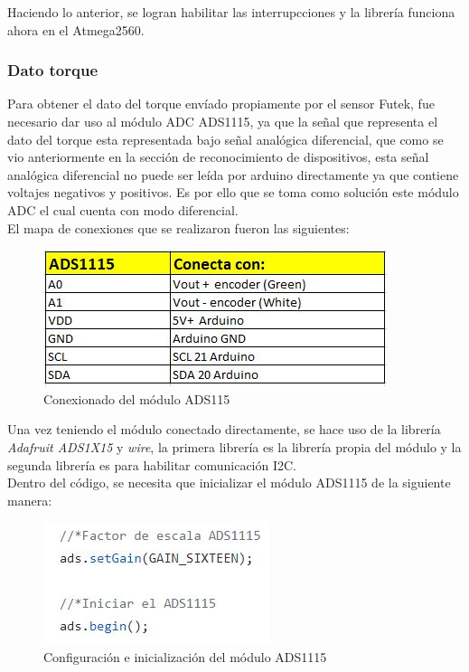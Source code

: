 \documentclass[12pt,titlepage]{article}
\begin{document}
Haciendo lo anterior, se logran habilitar las interrupcciones y la librería funciona ahora en el Atmega2560. \\
\subsubsection{Dato torque }
Para obtener el dato del torque envíado propiamente por el sensor Futek, fue necesario dar uso al módulo ADC ADS1115, ya que la señal que representa el dato del torque esta representada bajo señal analógica diferencial, que como se vio anteriormente en la sección de reconocimiento de dispositivos, esta señal analógica diferencial no puede ser leída por arduino directamente ya que contiene voltajes negativos y positivos. Es por ello que se toma como solución este módulo ADC el cual cuenta con modo diferencial. \\ 

El mapa de conexiones que se realizaron fueron las siguientes: \\ 
\begin{figure}[htbp]
\hspace*{4.5cm} 
\includegraphics[scale=0.85]{conexiones1}
\caption{Conexionado del módulo ADS115}
\end{figure}
\newpage
Una vez teniendo el módulo conectado directamente, se hace uso de la librería \textit{Adafruit ADS1X15} y \textit{wire}, la primera librería es la librería propia del módulo y la segunda librería es para habilitar comunicación I2C. \\ 

Dentro del código, se necesita que inicializar el módulo ADS1115 de la siguiente manera: \\ 
\begin{figure}[htbp]
\hspace*{4.9cm} 
\includegraphics[scale=0.78]{ADS1115_init}
\caption{Configuración e inicialización del módulo ADS1115}
\end{figure}
\end{document}
